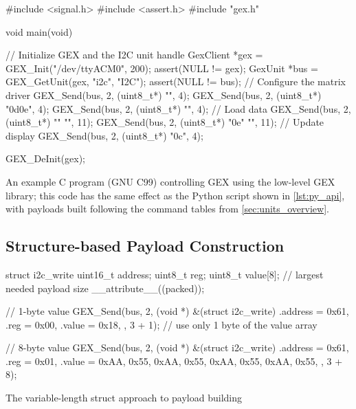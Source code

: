 \begin{listing}
	\begin{ccode}
	#include <signal.h>
	#include <assert.h>
	#include "gex.h"
			
	void main(void)
	{
	    // Initialize GEX and the I2C unit handle
	    GexClient *gex = GEX_Init("/dev/ttyACM0", 200);
	    assert(NULL != gex);        
	    GexUnit *bus = GEX_GetUnit(gex, "i2c", "I2C");
	    assert(NULL != bus);	    	    
	    // Configure the matrix driver
	    GEX_Send(bus, 2, (uint8_t*) "\x00", 4);
	    GEX_Send(bus, 2, (uint8_t*) "\x0d\x0e", 4);
	    GEX_Send(bus, 2, (uint8_t*) "", 4);	    
	    // Load data
	    GEX_Send(bus, 2, (uint8_t*) ""
	                                "\xAA{}\xAA{}\xAA{}\xAA{}", 11);
	    GEX_Send(bus, 2, (uint8_t*) "\x0e"
	                                "\xFF{}\xFF{}\xFF{}\xFF{}", 11);
	    // Update display
	    GEX_Send(bus, 2, (uint8_t*) "\x0c", 4);
	    	    
	    GEX_DeInit(gex);
	}    
	\end{ccode}
	\caption{\label{lst:c_api_full} An example C program (GNU C99) controlling GEX using the low-level GEX library; this code has the same effect as the Python script shown in \cref{lst:py_api}, with payloads built following the command tables from \cref{sec:units_overview}.}
\end{listing}

\subsection{Structure-based Payload Construction}

\begin{listing}
	\begin{ccode}
		struct i2c_write {
			uint16_t address;
			uint8_t reg;
			uint8_t value[8]; // largest needed payload size
		} __attribute__((packed));
		
		// 1-byte value
		GEX_Send(bus, 2, (void *) &(struct i2c_write) {
			.address = 0x61,
			.reg = 0x00,
			.value = {0x18},
		}, 3 + 1); // use only 1 byte of the value array
		
		// 8-byte value
		GEX_Send(bus, 2, (void *) &(struct i2c_write) {
			.address = 0x61,
			.reg = 0x01,
			.value = {0xAA, 0x55, 0xAA, 0x55, 0xAA, 0x55, 0xAA, 0x55},
		}, 3 + 8);
	\end{ccode}
	\caption{\label{lst:c_api_struct} The variable-length struct approach to payload building}
\end{listing}


